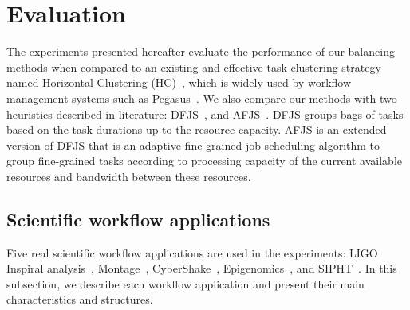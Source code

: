 







\section{Evaluation}
\label{sec:experiments}

The experiments presented hereafter evaluate the performance of our balancing methods when compared to an existing and effective task clustering strategy named Horizontal Clustering (HC)~\cite{Singh2008:}, which is widely used by workflow management systems such as Pegasus~\cite{Deelman2004}. We also compare our methods with two heuristics described in literature: DFJS~\cite{Muthuvelu2005}, and AFJS~\cite{Liu2009}. DFJS groups bags of tasks based on the task durations up to the resource capacity. AFJS is an extended version of DFJS that is an adaptive fine-grained job scheduling algorithm to group fine-grained tasks according to processing capacity of the current available resources and bandwidth between these resources.

\subsection{Scientific workflow applications}
\label{sec:applications}

Five real scientific workflow applications are used in the experiments: LIGO Inspiral analysis~\cite{LIGO}, Montage~\cite{Berriman2004}, CyberShake~\cite{Graves2010}, Epigenomics~\cite{Epigenome}, and SIPHT~\cite{SIPHT}. In this subsection, we describe each workflow application and present their main characteristics and structures.

